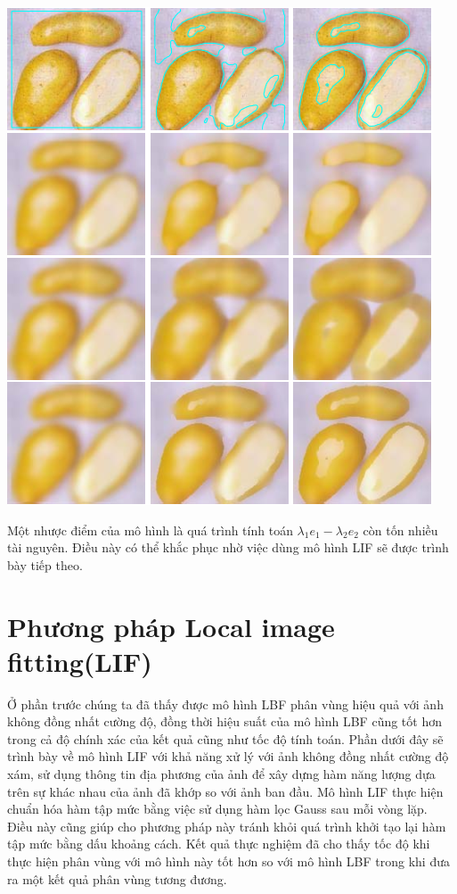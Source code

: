\documentclass[12pt, oneside, a4]{book}
\begin{document}
\begin{center}
\includegraphics[]{figure/denoise.png}
\end{center}

Một nhược điểm của mô hình là quá trình  tính toán $\lambda_1 e_1 -\lambda_2 e_2$ còn tốn nhiều tài nguyên. Điều này có thể khắc phục nhờ việc dùng mô hình LIF sẽ được trình bày tiếp theo.
\section{Phương pháp Local image fitting(LIF)}
Ở phần trước chúng ta đã thấy được mô hình LBF phân vùng hiệu quả với ảnh không đồng nhất cường độ, đồng thời hiệu suất của mô hình LBF cũng tốt hơn trong cả độ chính xác của kết quả cũng như tốc độ tính toán. Phần dưới đây sẽ trình bày về mô hình LIF với khả năng xử lý với ảnh không đồng nhất cường độ xám, sử dụng thông tin địa phương của ảnh để xây dựng hàm năng lượng dựa trên sự khác nhau của ảnh đã khớp so với ảnh ban đầu. Mô hình LIF thực hiện chuẩn hóa hàm tập mức bằng việc sử dụng hàm lọc Gauss sau mỗi vòng lặp. Điều này cũng giúp cho phương pháp này tránh khỏi quá trình khởi tạo lại hàm tập mức bằng dấu khoảng cách. Kết quả thực nghiệm đã cho thấy tốc độ khi thực hiện phân vùng với mô hình này tốt hơn so với mô hình LBF trong khi đưa ra một kết quả phân vùng tương đương.
\end{document}
